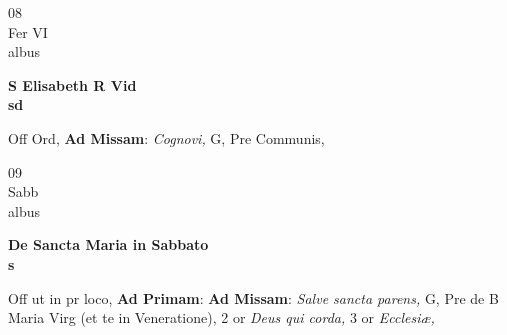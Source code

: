\documentclass[10pt, openany]{book}
\begin{document}
        \begin{center}
            \begin{minipage}{3.5in}
                \vspace{2em}
                \begin{minipage}{0.5in}
                    {\Huge 08} \\
                    {\normalsize Fer VI} \\
                    {\normalsize albus}
                \end{minipage}
                \begin{minipage}{3.0in}
                    \textbf{ \large S Elisabeth R Vid \\
                    \textnormal{\normalsize sd}} \\ 
                \end{minipage}
                \begin{justify}Off Ord, \textbf{Ad Missam}: \textit{Cognovi,} G, Pre Communis,  
                \end{justify}
            \end{minipage}
        \end{center}
    
        \begin{center}
            \begin{minipage}{3.5in}
                \vspace{2em}
                \begin{minipage}{0.5in}
                    {\Huge 09} \\
                    {\normalsize Sabb} \\
                    {\normalsize albus}
                \end{minipage}
                \begin{minipage}{3.0in}
                    \textbf{ \large De Sancta Maria in Sabbato \\
                    \textnormal{\normalsize s}} \\ 
                \end{minipage}
                \begin{justify}Off ut in pr loco, \textbf{Ad Primam}: \textbf{Ad Missam}: \textit{Salve sancta parens,} G, Pre de B Maria Virg (et te in Veneratione), 2 or \textit{Deus qui corda,} 3 or \textit{Ecclesiæ,}  
                \end{justify}
            \end{minipage}
        \end{center}
    
\end{document}
